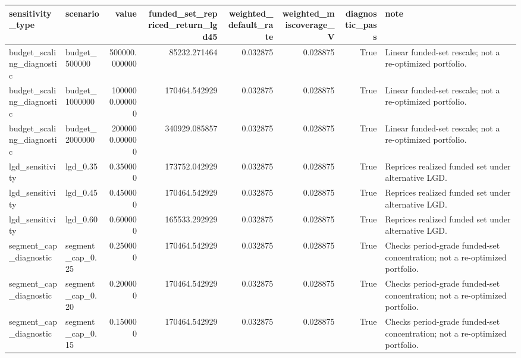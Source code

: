 \begin{tabular}{llrrrrrl}
\toprule
sensitivity\_type & scenario & value & funded\_set\_repriced\_return\_lgd45 & weighted\_default\_rate & weighted\_miscoverage\_V & diagnostic\_pass & note \\
\midrule
budget\_scaling\_diagnostic & budget\_500000 & 500000.000000 & 85232.271464 & 0.032875 & 0.028875 & True & Linear funded-set rescale; not a re-optimized portfolio. \\
budget\_scaling\_diagnostic & budget\_1000000 & 1000000.000000 & 170464.542929 & 0.032875 & 0.028875 & True & Linear funded-set rescale; not a re-optimized portfolio. \\
budget\_scaling\_diagnostic & budget\_2000000 & 2000000.000000 & 340929.085857 & 0.032875 & 0.028875 & True & Linear funded-set rescale; not a re-optimized portfolio. \\
lgd\_sensitivity & lgd\_0.35 & 0.350000 & 173752.042929 & 0.032875 & 0.028875 & True & Reprices realized funded set under alternative LGD. \\
lgd\_sensitivity & lgd\_0.45 & 0.450000 & 170464.542929 & 0.032875 & 0.028875 & True & Reprices realized funded set under alternative LGD. \\
lgd\_sensitivity & lgd\_0.60 & 0.600000 & 165533.292929 & 0.032875 & 0.028875 & True & Reprices realized funded set under alternative LGD. \\
segment\_cap\_diagnostic & segment\_cap\_0.25 & 0.250000 & 170464.542929 & 0.032875 & 0.028875 & True & Checks period-grade funded-set concentration; not a re-optimized portfolio. \\
segment\_cap\_diagnostic & segment\_cap\_0.20 & 0.200000 & 170464.542929 & 0.032875 & 0.028875 & True & Checks period-grade funded-set concentration; not a re-optimized portfolio. \\
segment\_cap\_diagnostic & segment\_cap\_0.15 & 0.150000 & 170464.542929 & 0.032875 & 0.028875 & True & Checks period-grade funded-set concentration; not a re-optimized portfolio. \\
\bottomrule
\end{tabular}

